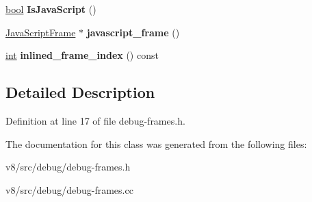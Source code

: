 \begin{DoxyCompactItemize}
\mbox{\hyperlink{classbool}{bool}} {\bfseries Is\+Java\+Script} ()
\item 
\mbox{\label{classv8_1_1internal_1_1FrameInspector_aa1499ec0381e7b6b549960f6922b2511}} 
\mbox{\hyperlink{classv8_1_1internal_1_1JavaScriptFrame}{Java\+Script\+Frame}} $\ast$ {\bfseries javascript\+\_\+frame} ()
\item 
\mbox{\label{classv8_1_1internal_1_1FrameInspector_a657e6fcf5ba73f6882d29deb9cd73173}} 
\mbox{\hyperlink{classint}{int}} {\bfseries inlined\+\_\+frame\+\_\+index} () const
\end{DoxyCompactItemize}


\subsection{Detailed Description}


Definition at line 17 of file debug-\/frames.\+h.



The documentation for this class was generated from the following files\+:\begin{DoxyCompactItemize}
\item 
v8/src/debug/debug-\/frames.\+h\item 
v8/src/debug/debug-\/frames.\+cc\end{DoxyCompactItemize}
